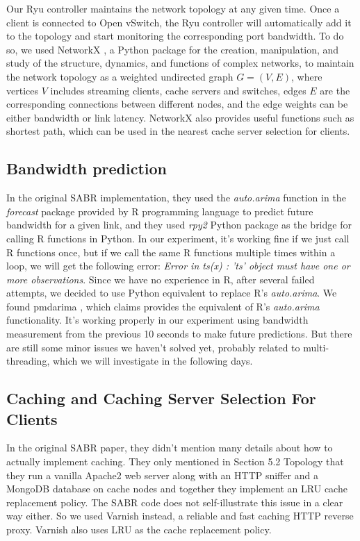 \documentclass{article}
\begin{document}
Our Ryu controller maintains the network topology at any given time. Once a client is connected to Open vSwitch, the Ryu controller will automatically add it to the topology and start monitoring the corresponding port bandwidth. To do so, we used NetworkX \cite{networkx}, a Python package for the creation, manipulation, and study of the structure, dynamics, and functions of complex networks, to maintain the network topology as a weighted undirected graph $G=(V, E)$, where vertices $V$ includes streaming clients, cache servers and switches, edges $E$ are the corresponding connections between different nodes, and the edge weights can be either bandwidth or link latency. NetworkX also provides useful functions such as shortest path, which can be used in the nearest cache server selection for clients. 

\subsection{Bandwidth prediction}
In the original SABR implementation, they used the \textit{auto.arima} function in the \textit{forecast} package provided by R programming language to predict future bandwidth for a given link, and they used \textit{rpy2} Python package as the bridge for calling R functions in Python. In our experiment, it's working fine if we just call R functions once, but if we call the same R functions multiple times within a loop, we will get the following error: \textit{Error in ts(x) : 'ts' object must have one or more observations}. Since we have no experience in R, after several failed attempts, we decided to use Python equivalent to replace R's \textit{auto.arima}. We found pmdarima \cite{pmdarima}, which claims provides the equivalent of R's \textit{auto.arima} functionality. It's working properly in our experiment using bandwidth measurement from the previous 10 seconds to make future predictions. But there are still some minor issues we haven't solved yet, probably related to multi-threading, which we will investigate in the following days. 

\subsection{Caching and Caching Server Selection For Clients}
In the original SABR paper, they didn't mention many details about how to actually implement caching. They only mentioned in Section 5.2 Topology that they run a vanilla Apache2 web server along with an HTTP sniffer and a MongoDB database on cache nodes and together they implement an LRU cache replacement policy. The SABR code does not self-illustrate this issue in a clear way either. So we used Varnish \cite{varnish} instead, a reliable and fast caching HTTP reverse proxy. Varnish also uses LRU as the cache replacement policy. 
\end{document}

